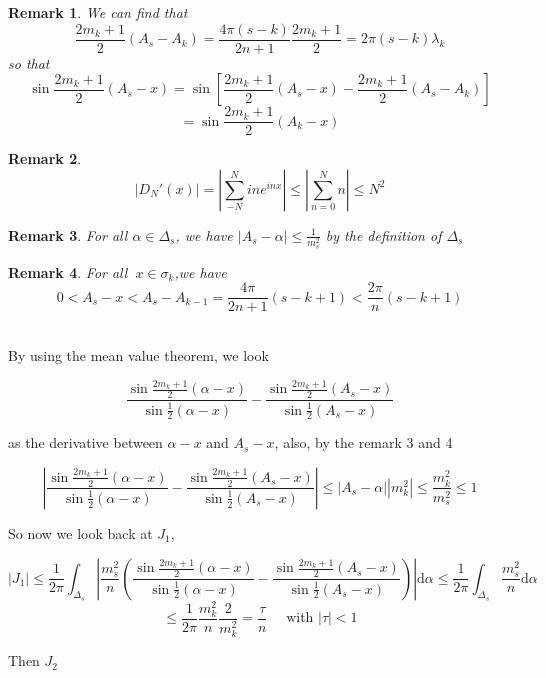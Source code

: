 \documentclass{article}
\newtheorem{remark}{Remark}
\begin{document}
\begin{enumerate}
\begin{remark}
    We can find that 
    \[ \frac{2m_k+1}{2}(A_s-A_k)=\frac{4\pi(s-k)}{2n+1}\frac{2m_k+1}{2}=2\pi(s-k)\lambda_k \]
    so that 
    \[ \sin\frac{2m_k+1}{2}(A_s-x)=\sin\left[\frac{2m_k+1}{2}(A_s-x)-\frac{2m_k+1}{2}(A_s-A_k)\right]\]
    \[ =\sin\frac{2m_k+1}{2}(A_k-x) \]
\end{remark}

\begin{remark}
    \[ |D_N'(x)|=|\sum\limits_{-N}^{N}ine^{inx}| \leqslant |\sum_{n=0}^{N}n| \leqslant N^2\]
\end{remark}
\begin{remark}
    For all $ \alpha \in \Delta_s $, we have $ |A_s-\alpha|\leqslant \frac{1}{m_s^2} $ by the definition of $ \Delta_s $
\end{remark}

\begin{remark}
    
    For all $\ x \in \sigma_k$,we have 
    \[ 0<A_s-x<A_s-A_{k-1}=\frac{4\pi}{2n+1}(s-k+1)<\frac{2\pi}{n}(s-k+1) \]
\end{remark}

~\\


 By using the mean value theorem, we look 

\[ \frac{\sin\frac{2m_k+1}{2}(\alpha-x)}{\sin\frac{1}{2}(\alpha-x)}   - \frac{\sin\frac{2m_k+1}{2}(A_s-x)}{\sin\frac{1}{2}(A_s-x)}  \]

as the derivative between $ \alpha -x  $ and $ A_s-x $, also, by the remark 3 and 4

\[ | \frac{\sin\frac{2m_k+1}{2}(\alpha-x)}{\sin\frac{1}{2}(\alpha-x)}   - \frac{\sin\frac{2m_k+1}{2}(A_s-x)}{\sin\frac{1}{2}(A_s-x)}| \leqslant |A_s-\alpha||m_k^2| \leqslant \frac{m_k^2}{m_s^2}\leqslant 1\] 

So now we look back at $ J_1 $,

\[ |J_1|\leqslant \frac{1}{2\pi}\int_{\Delta_s}|\frac{m_s^2}{n}\left(\frac{\sin\frac{2m_k+1}{2}(\alpha-x)}{\sin\frac{1}{2}(\alpha-x)}   - \frac{\sin\frac{2m_k+1}{2}(A_s-x)}{\sin\frac{1}{2}(A_s-x)} \right)| \mathrm{d}\alpha  \leqslant \frac{1}{2\pi}\int_{\Delta_s}\frac{m_s^2}{n}\mathrm{d}\alpha\]
\[\leqslant \frac{1}{2\pi}\frac{m_k^2}{n}\frac{2}{m_k^2}=\frac{\tau}{n}  \quad \text{ with } |\tau|<1\] 



Then $ J_2 $





\end{enumerate}
\end{document}

